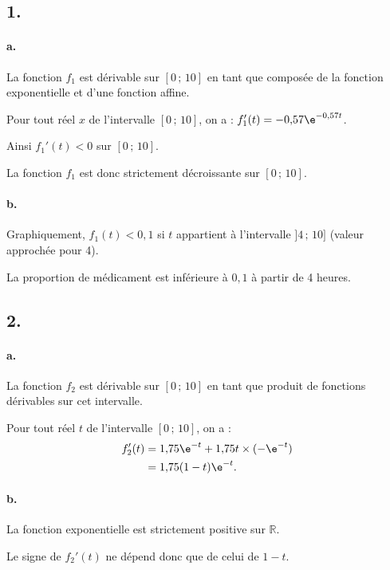 \subsection*{1.}

\paragraph{a.} La fonction \( f_1 \) est dérivable sur \([0\,;\,10]\) en tant que composée de la fonction exponentielle et d'une fonction affine.

Pour tout réel \( x \) de l'intervalle \([0\,;\,10]\), on a : \( f_1'(t) = -0{,}57 \e^{-0{,}57t} \).

Ainsi \( f_1'(t) < 0 \) sur \([0\,;\,10]\).

La fonction \( f_1 \) est donc strictement décroissante sur \([0\,;\,10]\).

\paragraph{b.} Graphiquement, \( f_1(t) < 0{,}1 \) si \( t \) appartient à l'intervalle \( ]4\,;\,10] \) (valeur approchée pour 4).

La proportion de médicament est inférieure à \(0{,}1\) à partir de 4 heures.

\subsection*{2.}

\paragraph{a.} La fonction \( f_2 \) est dérivable sur \([0\,;\,10]\) en tant que produit de fonctions dérivables sur cet intervalle.

Pour tout réel \( t \) de l'intervalle \([0\,;\,10]\), on a :
\begin{align*}
f_2'(t) &= 1{,}75 \e^{-t} + 1{,}75t \times (-\e^{-t}) \\
&= 1{,}75 (1 - t) \e^{-t}.
\end{align*}

\paragraph{b.} La fonction exponentielle est strictement positive sur \( \mathbb{R} \).

Le signe de \( f_2'(t) \) ne dépend donc que de celui de \( 1 - t \).

